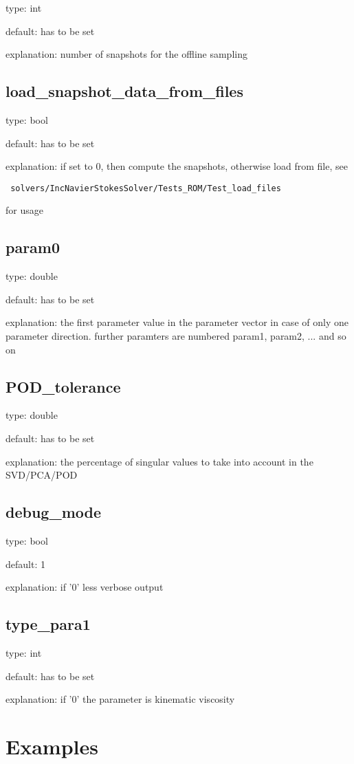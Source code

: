 \documentclass[a4paper,10pt]{article}
\begin{document}
\noindent type: int

\noindent default: has to be set

\noindent explanation: number of snapshots for the offline sampling


\subsection{load\_snapshot\_data\_from\_files}

\noindent type: bool

\noindent default: has to be set

\noindent explanation: if set to 0, then compute the snapshots, otherwise load from file, see
\begin{verbatim}
 solvers/IncNavierStokesSolver/Tests_ROM/Test_load_files
\end{verbatim}
for usage


\subsection{param0}

\noindent type: double

\noindent default: has to be set

\noindent explanation: the first parameter value in the parameter vector in case of only one parameter direction. further paramters are numbered param1, param2, ... and so on

\subsection{POD\_tolerance}

\noindent type: double

\noindent default: has to be set

\noindent explanation: the percentage of singular values to take into account in the SVD/PCA/POD


\subsection{debug\_mode}

\noindent type: bool

\noindent default: 1

\noindent explanation: if '0' less verbose output

\subsection{type\_para1}

\noindent type: int

\noindent default: has to be set

\noindent explanation: if '0' the parameter is kinematic viscosity



   

\section{Examples}
\end{document}
